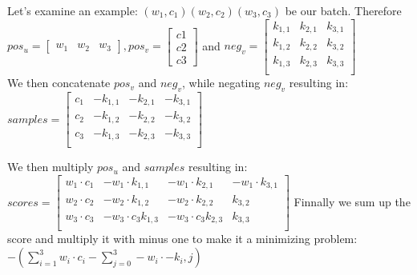 Let's examine an example: $(w_1,c_1)(w_2,c_2)(w_3,c_3)$ be our batch. 
Therefore $pos_u = \begin{bmatrix}
w_1 & w_2 & w_3
\end{bmatrix}, pos_v = \begin{bmatrix}
c1\\
c2\\
c3\end{bmatrix}$ and $neg_v = 
\begin{bmatrix}
k_{1,1} & k_{2,1} & k_{3,1}\\
k_{1,2} & k_{2,2} & k_{3,2}\\
k_{1,3} & k_{2,3} & k_{3,3}\\
\end{bmatrix}$\\
 We then concatenate $pos_v$ and $neg_v$, while negating $neg_v$
resulting in: \\
$samples = \begin{bmatrix}
c_1 & -k_{1,1} & -k_{2,1} & - k_{3,1}\\
c_2 &- k_{1,2} & -k_{2,2} & -k_{3,2}\\
c_3 & -k_{1,3} & -k_{2,3}& - k_{3,3}\\
\end{bmatrix}$

We then multiply $pos_u$ and $samples$ resulting in: \\
$scores = \begin{bmatrix}
w_1 \cdot c_1 & -w_1 \cdot k_{1,1} & -w_1 \cdot  k_{2,1} & -w_1 \cdot  k_{3,1}\\
w_2 \cdot c_2 & -w_2 \cdot k_{1,2} & -w_2 \cdot k_{2,2} & k_{3,2}\\
w_3 \cdot c_3 &-w_3 \cdot c_3  k_{1,3} & -w_3 \cdot c_3 k_{2,3}& k_{3,3}\\
\end{bmatrix}$
Finnally we sum up the score and multiply it with minus one to make it a minimizing problem: \\
 $-(\sum_{i=1}^3 w_i \cdot c_i - \sum_{j=0}^3 -w_i \cdot -k_i,j)$